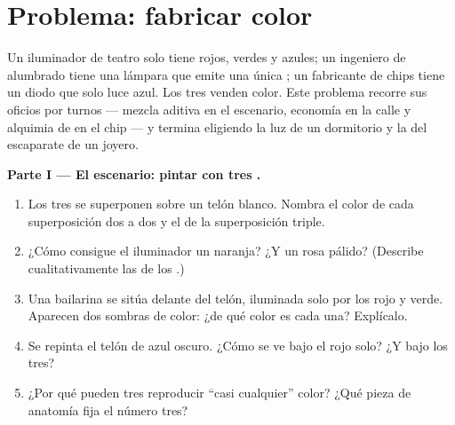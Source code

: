 \section{Problema: fabricar color}

\begin{problem}
\label{pb:g11:color-light-sources:1}
Un iluminador de teatro solo tiene  rojos, verdes y azules; un
ingeniero de alumbrado tiene una lámpara que emite una única ; un fabricante de chips tiene un diodo que solo luce azul. Los tres
venden color. Este problema recorre sus oficios por turnos --- mezcla
aditiva en el escenario, economía  en la calle y alquimia
de  en el chip --- y termina eligiendo la luz de un dormitorio y
la del escaparate de un joyero.

\medskip
\noindent\textbf{Parte I --- El escenario: pintar con tres .}
\begin{enumerate}
  \item Los tres  se superponen sobre un telón blanco. Nombra el
        color de cada superposición dos a dos y el de la superposición
        triple.
  \item ¿Cómo consigue el iluminador un naranja? ¿Y un rosa pálido?
        (Describe cualitativamente las  de los .)
  \item Una bailarina se sitúa delante del telón, iluminada solo por los
         rojo y verde. Aparecen dos sombras de color: ¿de qué color
        es cada una? Explícalo.
  \item Se repinta el telón de azul oscuro. ¿Cómo se ve bajo el 
        rojo solo? ¿Y bajo los tres?
  \item ¿Por qué pueden tres  reproducir ``casi cualquier'' color?
        ¿Qué pieza de anatomía fija el número tres?
\end{enumerate}


\end{problem}
